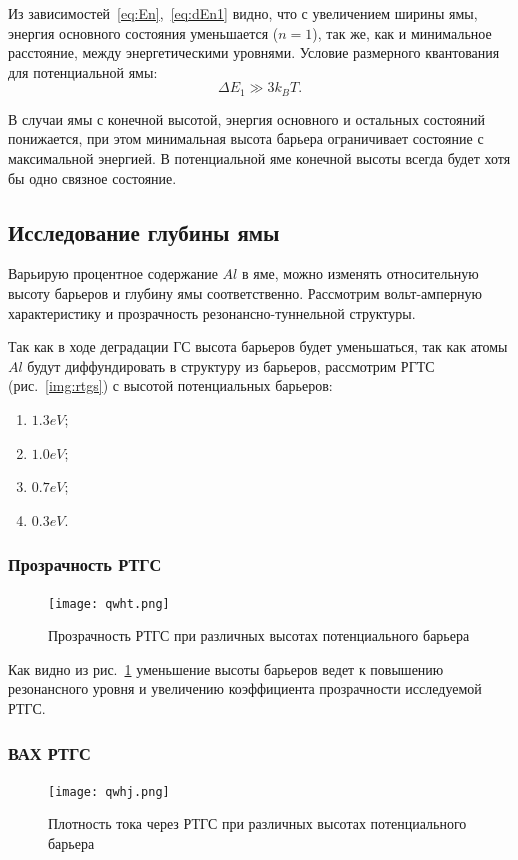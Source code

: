Из зависимостей~\ref{eq:En},~\ref{eq:dEn1}  видно, что с увеличением ширины ямы, энергия основного состояния уменьшается ($n = 1$), так же, как и минимальное расстояние, между энергетическими уровнями. Условие размерного квантования для потенциальной ямы:
\begin{equation}
	\Delta E_{1} \gg 3k_{B}T.
\end{equation}

В случаи ямы с конечной высотой, энергия основного и остальных состояний понижается, при этом минимальная высота барьера ограничивает состояние с максимальной энергией. В потенциальной яме конечной высоты всегда будет хотя бы одно связное состояние.

\subsection{Исследование глубины ямы}
Варьирую процентное содержание $Al$ в яме, можно изменять относительную высоту барьеров и глубину ямы соответственно. Рассмотрим вольт-амперную характеристику и прозрачность резонансно-туннельной структуры.

Так как в ходе деградации ГС высота барьеров будет уменьшаться, так как атомы $Al$ будут диффундировать в структуру из барьеров, рассмотрим РГТС (рис.~\ref{img:rtgs}) с высотой потенциальных барьеров:
\begin{enumerate}
	\item $1.3 eV$;
	\item $1.0 eV$;
	\item $0.7 eV$;
	\item $0.3 eV$.
\end{enumerate}

\subsubsection{Прозрачность РТГС}
\begin{figure}[h!]
	\centering
	\texttt{[image: qwht.png]}
	\caption{Прозрачность РТГС при различных высотах потенциального барьера}
	\label{fig:qwt}
\end{figure}

Как видно из рис.~\ref{fig:qwt} уменьшение высоты барьеров ведет к повышению резонансного уровня и увеличению коэффициента прозрачности исследуемой РТГС. 

\subsubsection{ВАХ РТГС}
\begin{figure}[h!]
	\centering
	\texttt{[image: qwhj.png]}
	\caption{Плотность тока через РТГС при различных высотах потенциального барьера}
	\label{fig:qwj}
\end{figure}

